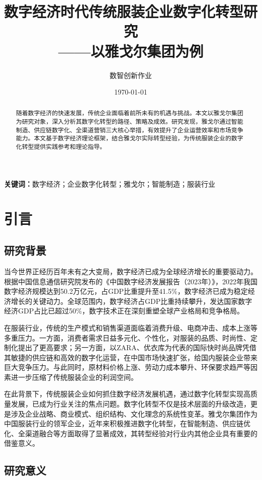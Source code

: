 \documentclass[12pt,a4paper]{article}
\title{数字经济时代传统服装企业数字化转型研究\\
——以雅戈尔集团为例}
\author{数智创新作业}
\date{\today}
\begin{document}
\maketitle

\begin{abstract}
随着数字经济的快速发展，传统企业面临着前所未有的机遇与挑战。本文以雅戈尔集团为研究对象，深入分析其数字化转型的路径、策略及成效。研究发现，雅戈尔通过智能制造、供应链数字化、全渠道营销三大核心举措，有效提升了企业运营效率和市场竞争能力。本文基于数字经济理论框架，结合雅戈尔实际转型经验，为传统服装企业的数字化转型提供实践参考和理论指导。
\end{abstract}

\textbf{关键词：}数字经济；企业数字化转型；雅戈尔；智能制造；服装行业

\newpage

\section{引言}

\subsection{研究背景}

当今世界正经历百年未有之大变局，数字经济已成为全球经济增长的重要驱动力。根据中国信息通信研究院发布的《中国数字经济发展报告（2023年）》，2022年我国数字经济规模达到50.2万亿元，占GDP比重提升至41.5\%，数字经济已成为稳定经济增长的关键动力。全球范围内，数字经济占GDP比重持续攀升，发达国家数字经济GDP占比已超过50\%，数字技术正在深刻重塑全球产业格局和竞争格局。

在服装行业，传统的生产模式和销售渠道面临着消费升级、电商冲击、成本上涨等多重压力。一方面，消费者需求日益多元化、个性化，对服装的品质、时尚性、定制化提出了更高要求；另一方面，以ZARA、优衣库为代表的国际快时尚品牌凭借其敏捷的供应链和高效的数字化运营，在中国市场快速扩张，给国内服装企业带来巨大竞争压力。与此同时，原材料价格上涨、劳动力成本攀升、环保要求趋严等因素进一步压缩了传统服装企业的利润空间。

在此背景下，传统服装企业如何抓住数字经济发展机遇，通过数字化转型实现高质量发展，已成为行业关注的焦点问题。数字化转型不仅是技术层面的升级改造，更是涉及企业战略、商业模式、组织结构、文化理念的系统性变革。雅戈尔集团作为中国服装行业的领军企业，近年来积极推进数字化转型，在智能制造、供应链优化、全渠道融合等方面取得了显著成效，其转型经验对行业内其他企业具有重要的借鉴意义。

\subsection{研究意义}
\end{document}
